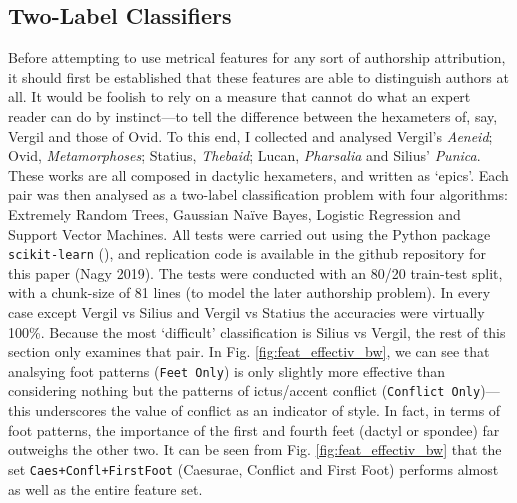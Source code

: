 \documentclass[11pt,a4paper]{scrartcl} %
\begin{document}
\subsection{Two-Label Classifiers}

Before attempting to use metrical features for any sort of authorship attribution, it should first be established that these features are able to distinguish authors at all. It would be foolish to rely on a measure that cannot do what an expert reader can do by instinct---to tell the difference between the hexameters of, say, Vergil and those of Ovid. To this end, I collected and analysed Vergil's \textit{Aeneid}; Ovid, \textit{Metamorphoses}; Statius, \textit{Thebaid}; Lucan, \textit{Pharsalia} and Silius' \textit{Punica}. These works are all composed in dactylic hexameters, and written as `epics'. Each pair was then analysed as a two-label classification problem with four algorithms: Extremely Random Trees, Gaussian Naïve Bayes, Logistic Regression and Support Vector Machines. All tests were carried out using the Python package \texttt{scikit-learn} (\cite{scikit-learn}), and replication code is available in the github repository for this paper (Nagy 2019). The tests were conducted with an 80/20 train-test split, with a chunk-size of 81 lines (to model the later authorship problem). In every case except Vergil vs Silius and Vergil vs Statius the accuracies were virtually 100\%. Because the most `difficult' classification is Silius vs Vergil, the rest of this section only examines that pair. In Fig. \ref{fig:feat_effectiv_bw}, we can see that analsying foot patterns (\texttt{Feet Only}) is only slightly more effective than considering nothing but the patterns of ictus/accent conflict (\texttt{Conflict Only})---this underscores the value of conflict as an indicator of style. In fact, in terms of foot patterns, the importance of the first and fourth feet (dactyl or spondee) far outweighs the other two. It can be seen from Fig. \ref{fig:feat_effectiv_bw} that the set \texttt{Caes+Confl+FirstFoot} (Caesurae, Conflict and First Foot) performs almost as well as the entire feature set.
\end{document}
